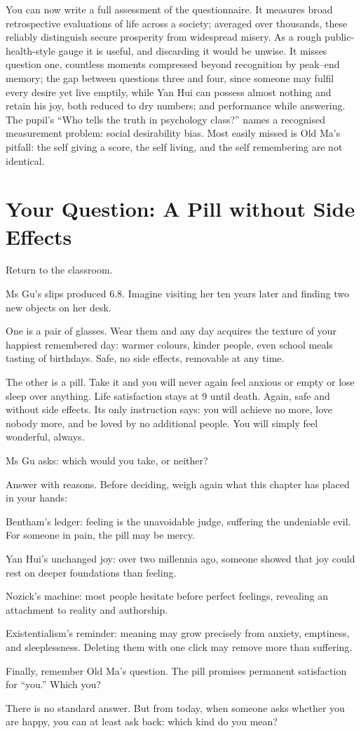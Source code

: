You can now write a full assessment of the questionnaire. It measures broad retrospective evaluations of life across a society; averaged over thousands, these reliably distinguish secure prosperity from widespread misery. As a rough public-health-style gauge it is useful, and discarding it would be unwise. It misses question one, countless moments compressed beyond recognition by peak--end memory; the gap between questions three and four, since someone may fulfil every desire yet live emptily, while Yan Hui can possess almost nothing and retain his joy, both reduced to dry numbers; and performance while answering. The pupil's ``Who tells the truth in psychology class?'' names a recognised measurement problem: social desirability bias. Most easily missed is Old Ma's pitfall: the self giving a score, the self living, and the self remembering are not identical.

\section{Your Question: A Pill without Side Effects}
Return to the classroom.

Ms Gu's slips produced 6.8. Imagine visiting her ten years later and finding two new objects on her desk.

One is a pair of glasses. Wear them and any day acquires the texture of your happiest remembered day: warmer colours, kinder people, even school meals tasting of birthdays. Safe, no side effects, removable at any time.

The other is a pill. Take it and you will never again feel anxious or empty or lose sleep over anything. Life satisfaction stays at 9 until death. Again, safe and without side effects. Its only instruction says: you will achieve no more, love nobody more, and be loved by no additional people. You will simply feel wonderful, always.

Ms Gu asks: which would you take, or neither?

Answer with reasons. Before deciding, weigh again what this chapter has placed in your hands:

Bentham's ledger: feeling is the unavoidable judge, suffering the undeniable evil. For someone in pain, the pill may be mercy.

Yan Hui's unchanged joy: over two millennia ago, someone showed that joy could rest on deeper foundations than feeling.

Nozick's machine: most people hesitate before perfect feelings, revealing an attachment to reality and authorship.

Existentialism's reminder: meaning may grow precisely from anxiety, emptiness, and sleeplessness. Deleting them with one click may remove more than suffering.

Finally, remember Old Ma's question. The pill promises permanent satisfaction for ``you.'' Which you?

There is no standard answer. But from today, when someone asks whether you are happy, you can at least ask back: which kind do you mean?
